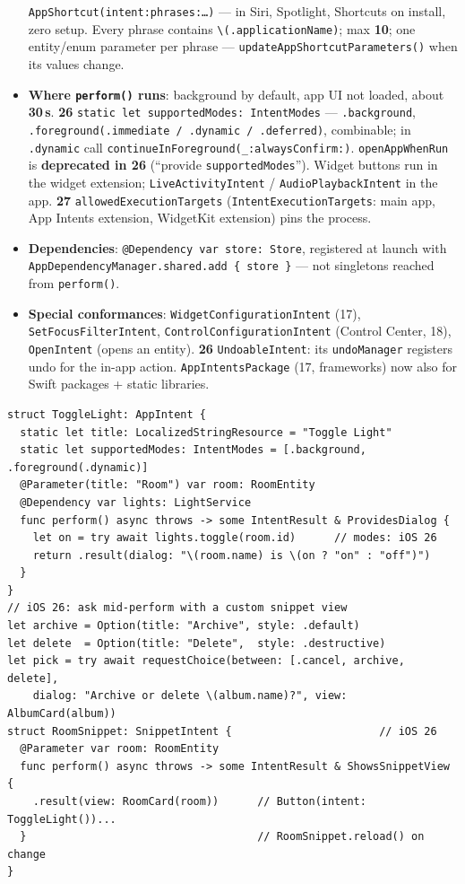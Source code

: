 \documentclass[8pt]{extarticle}
\newcommand\ct[1]{\texttt{#1}}
\newcommand\hd[1]{\par\vspace{3pt}\noindent{\bfseries\color{sheetBlue}#1}\par\vspace{1pt}}
\newcommand\vv[1]{\textcolor{sheetOrange}{\textbf{#1}}}
\begin{document}
\begin{multicols}{2}
\begin{itemize}
        \ct{AppShortcut(intent:phrases:\ldots)} — in Siri, Spotlight, Shortcuts on install, zero setup.
        Every phrase contains \ct{\textbackslash(.applicationName)}; max \textbf{10}; one entity/enum
        parameter per phrase — \ct{updateAppShortcutParameters()} when its values change.
  \item \textbf{Where \ct{perform()} runs}: background by default, app UI not loaded, about
        \textbf{30\,s}. \vv{26} \ct{static let supportedModes: IntentModes} — \ct{.background},
        \ct{.foreground(.immediate / .dynamic / .deferred)}, combinable; in \ct{.dynamic} call
        \ct{continueInForeground(\_:alwaysConfirm:)}. \ct{openAppWhenRun} is \textbf{deprecated in 26}
        (``provide \ct{supportedModes}''). Widget buttons run in the widget extension;
        \ct{LiveActivityIntent} / \ct{AudioPlaybackIntent} in the app.
        \vv{27} \ct{allowedExecutionTargets} (\ct{IntentExecutionTargets}: main app, App Intents
        extension, WidgetKit extension) pins the process.
  \item \textbf{Dependencies}: \ct{@Dependency var store: Store}, registered at launch with
        \ct{AppDependencyManager.shared.add \{ store \}} — not singletons reached from \ct{perform()}.
  \item \textbf{Special conformances}: \ct{WidgetConfigurationIntent} (17), \ct{SetFocusFilterIntent},
        \ct{ControlConfigurationIntent} (Control Center, 18), \ct{OpenIntent} (opens an entity).
        \vv{26} \ct{UndoableIntent}: its \ct{undoManager} registers undo for the in-app action.
        \ct{AppIntentsPackage} (17, frameworks) now also for Swift packages + static libraries.
\end{itemize}

\hd{Example}
\begin{lstlisting}[language=SwiftSheet]
struct ToggleLight: AppIntent {
  static let title: LocalizedStringResource = "Toggle Light"
  static let supportedModes: IntentModes = [.background, .foreground(.dynamic)]
  @Parameter(title: "Room") var room: RoomEntity
  @Dependency var lights: LightService
  func perform() async throws -> some IntentResult & ProvidesDialog {
    let on = try await lights.toggle(room.id)      // modes: iOS 26
    return .result(dialog: "\(room.name) is \(on ? "on" : "off")")
  }
}
// iOS 26: ask mid-perform with a custom snippet view
let archive = Option(title: "Archive", style: .default)
let delete  = Option(title: "Delete",  style: .destructive)
let pick = try await requestChoice(between: [.cancel, archive, delete],
    dialog: "Archive or delete \(album.name)?", view: AlbumCard(album))
struct RoomSnippet: SnippetIntent {                       // iOS 26
  @Parameter var room: RoomEntity
  func perform() async throws -> some IntentResult & ShowsSnippetView {
    .result(view: RoomCard(room))      // Button(intent: ToggleLight())...
  }                                    // RoomSnippet.reload() on change
}
\end{lstlisting}


\end{multicols}
\end{document}
